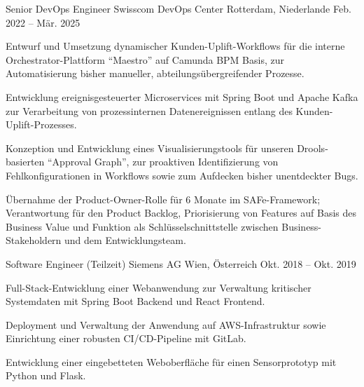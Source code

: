 


\begin{cventries}

\cventry
{Senior DevOps Engineer} %
{Swisscom DevOps Center} %
{Rotterdam, Niederlande} %
{Feb. 2022 -- Mär. 2025} %
{ %
\begin{cvitems}
\item {Entwurf und Umsetzung dynamischer Kunden-Uplift-Workflows für die interne Orchestrator-Plattform \enquote{Maestro} auf Camunda BPM Basis, zur Automatisierung bisher manueller, abteilungsübergreifender Prozesse.}
\item {Entwicklung ereignisgesteuerter Microservices mit Spring Boot und Apache Kafka zur Verarbeitung von prozessinternen Datenereignissen entlang des Kunden-Uplift-Prozesses.}
\item {Konzeption und Entwicklung eines Visualisierungstools für unseren Drools-basierten \enquote{Approval Graph}, zur proaktiven Identifizierung von Fehlkonfigurationen in Workflows sowie zum Aufdecken bisher unentdeckter Bugs.}
\item {Übernahme der Product-Owner-Rolle für 6 Monate im SAFe-Framework; Verantwortung für den Product Backlog, Priorisierung von Features auf Basis des Business Value und Funktion als Schlüsselschnittstelle zwischen Business-Stakeholdern und dem Entwicklungsteam.}
\end{cvitems}
}

\cventry
{Software Engineer (Teilzeit)} %
{Siemens AG} %
{Wien, Österreich} %
{Okt. 2018 -- Okt. 2019} %
{ %
\begin{cvitems}
\item {Full-Stack-Entwicklung einer Webanwendung zur Verwaltung kritischer Systemdaten mit Spring Boot Backend und React Frontend.}
\item {Deployment und Verwaltung der Anwendung auf AWS-Infrastruktur sowie Einrichtung einer robusten CI/CD-Pipeline mit GitLab.}
\item {Entwicklung einer eingebetteten Weboberfläche für einen Sensorprototyp mit Python und Flask.}
\end{cvitems}
}


\end{cventries}
